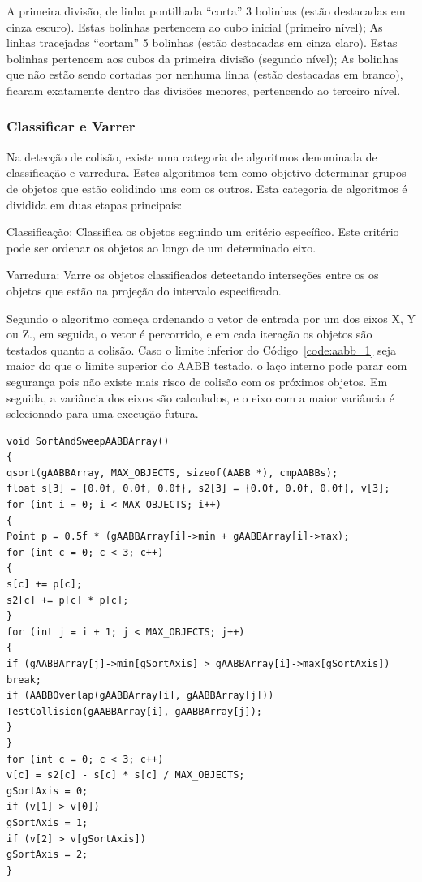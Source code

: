 A primeira divisão, de linha pontilhada “corta” 3 bolinhas (estão destacadas em cinza escuro). Estas bolinhas pertencem ao cubo inicial (primeiro nível); As linhas tracejadas “cortam” 5 bolinhas (estão destacadas em cinza claro). Estas bolinhas pertencem aos cubos da primeira divisão (segundo nível); As bolinhas que não estão sendo cortadas por nenhuma linha (estão destacadas em branco), ficaram exatamente dentro das divisões menores, pertencendo ao terceiro nível.

\subsubsection{Classificar e Varrer}

Na detecção de colisão, existe uma categoria de algoritmos denominada de
classificação e varredura. Estes algoritmos tem como objetivo determinar grupos
de objetos que estão colidindo uns com os outros. Esta categoria de algoritmos é dividida em duas etapas principais:

Classificação: Classifica os objetos seguindo um critério específico. Este
critério pode ser ordenar os objetos ao longo de um determinado eixo.

Varredura: Varre os objetos classificados detectando interseções entre os os
objetos que estão na projeção do intervalo especificado.

Segundo  o algoritmo começa ordenando o vetor de entrada por um dos eixos X, Y ou Z., em
seguida, o vetor é percorrido, e em cada iteração os objetos são testados
quanto a colisão. Caso o limite inferior do Código~\ref{code:aabb_1} seja maior do
que o limite superior do AABB testado, o laço interno pode parar com segurança
pois não existe mais risco de colisão com os próximos objetos. Em seguida, a
variância dos eixos são calculados, e o eixo com a maior variância é
selecionado para uma execução futura.

\begin{lstlisting}[frame=single,caption=Exemplo de ordenar e varrer\label{code:SortAndSweep}]
void SortAndSweepAABBArray()
{
qsort(gAABBArray, MAX_OBJECTS, sizeof(AABB *), cmpAABBs);
float s[3] = {0.0f, 0.0f, 0.0f}, s2[3] = {0.0f, 0.0f, 0.0f}, v[3];
for (int i = 0; i < MAX_OBJECTS; i++)
{
Point p = 0.5f * (gAABBArray[i]->min + gAABBArray[i]->max);
for (int c = 0; c < 3; c++)
{
s[c] += p[c];
s2[c] += p[c] * p[c];
}
for (int j = i + 1; j < MAX_OBJECTS; j++)
{
if (gAABBArray[j]->min[gSortAxis] > gAABBArray[i]->max[gSortAxis])
break;
if (AABBOverlap(gAABBArray[i], gAABBArray[j]))
TestCollision(gAABBArray[i], gAABBArray[j]);
}
}
for (int c = 0; c < 3; c++)
v[c] = s2[c] - s[c] * s[c] / MAX_OBJECTS;
gSortAxis = 0;
if (v[1] > v[0])
gSortAxis = 1;
if (v[2] > v[gSortAxis])
gSortAxis = 2;
}
\end{lstlisting}

